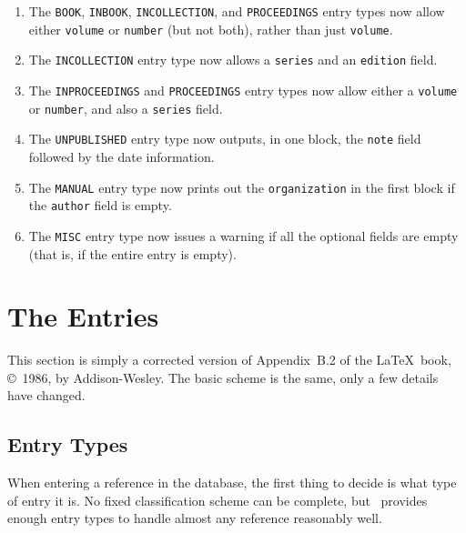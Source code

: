 \begin{enumerate}
\item
The \hbox{\tt BOOK}, \hbox{\tt INBOOK}, \hbox{\tt INCOLLECTION},
and \hbox{\tt PROCEEDINGS} entry types now allow either
\hbox{\tt volume} or \hbox{\tt number} (but not both),
rather than just \hbox{\tt volume}.

\item
The \hbox{\tt INCOLLECTION} entry type now allows
a \hbox{\tt series} and an \hbox{\tt edition} field.

\item
The \hbox{\tt INPROCEEDINGS} and \hbox{\tt PROCEEDINGS}
entry types now allow either a \hbox{\tt volume} or \hbox{\tt number},
and also a \hbox{\tt series} field.

\item
The \hbox{\tt UNPUBLISHED} entry type now outputs,
in one block, the \hbox{\tt note} field
followed by the date information.

\item
The \hbox{\tt MANUAL} entry type now prints out
the \hbox{\tt organization} in the first block
if the \hbox{\tt author} field is empty.

\item
The {\tt MISC} entry type now issues a warning
if all the optional fields are empty
(that is, if the entire entry is empty).

\end{enumerate}


\section{The Entries}
\label{latex-appendix}

This section is simply a corrected version of
Appendix~B.2 of the \LaTeX\ book\cite{latex},
\copyright~1986, by Addison-Wesley.
The basic scheme is the same, only a few details have changed.


\subsection{Entry Types}

When entering a reference in the database, the first thing to decide
is what type of entry it is.  No fixed classification scheme can be
complete, but \BibTeX\ provides enough entry types to handle almost
any reference reasonably well.

